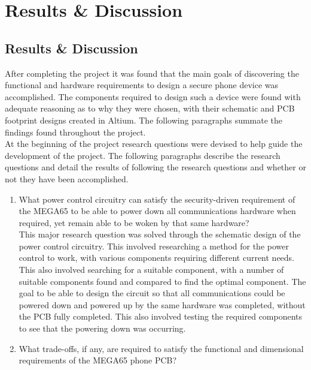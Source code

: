 
\chapter{Results \& Discussion} %

\label{Chapter7} %


\section{Results \& Discussion}

	After completing the project it was found that the main goals of discovering the functional and hardware requirements to design a secure phone device was accomplished. The components required to design such a device were found with adequate reasoning as to why they were chosen, with their schematic and PCB footprint designs created in Altium. The following paragraphs summate the findings found throughout the project.\\

	At the beginning of the project research questions were devised to help guide the development of the project. The following paragraphs describe the research questions and detail the results of following the research questions and whether or not they have been accomplished.\\

\begin{enumerate}
\item What power control circuitry can satisfy the security-driven requirement of the MEGA65 to be able to power down all communications hardware when required, yet remain able to be woken by that same hardware?\\

	This major research question was solved through the schematic design of the power control circuitry. This involved researching a method for the power control to work, with various components requiring different current needs. This also involved searching for a suitable component, with a number of suitable components found and compared to find the optimal component. The goal to be able to design the circuit so that all communications could be powered down and powered up by the same hardware was completed, without the PCB fully completed. This also involved testing the required components to see that the powering down was occurring.
	
\item What trade-offs, if any, are required to satisfy the functional and dimensional requirements of the MEGA65 phone PCB?
\end{enumerate}

